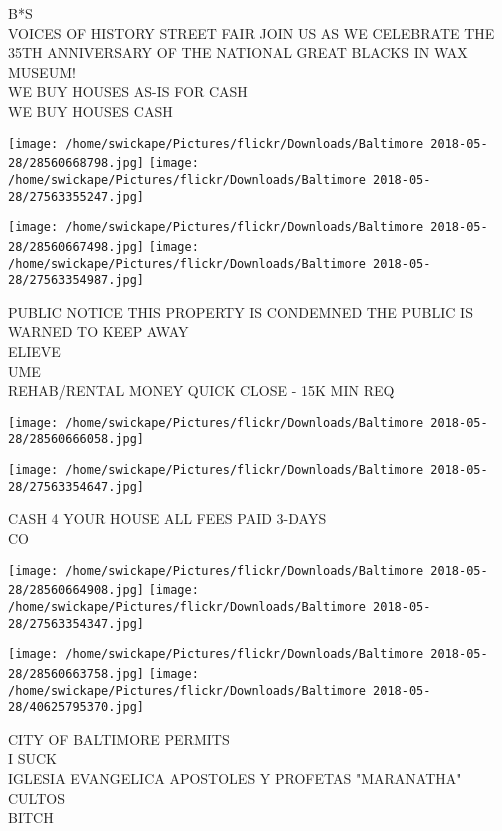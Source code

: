 \documentclass[10pt,letterpaper]{article}
\begin{document}
B*S\\
VOICES OF HISTORY STREET FAIR JOIN US AS WE CELEBRATE THE 35TH ANNIVERSARY OF THE NATIONAL GREAT BLACKS IN WAX MUSEUM!\\
WE BUY HOUSES AS{-}IS FOR CASH\\
WE BUY HOUSES CASH\\
\pagebreak

\texttt{[image: /home/swickape/Pictures/flickr/Downloads/Baltimore 2018-05-28/28560668798.jpg]}
\texttt{[image: /home/swickape/Pictures/flickr/Downloads/Baltimore 2018-05-28/27563355247.jpg]}

\texttt{[image: /home/swickape/Pictures/flickr/Downloads/Baltimore 2018-05-28/28560667498.jpg]}
\texttt{[image: /home/swickape/Pictures/flickr/Downloads/Baltimore 2018-05-28/27563354987.jpg]}

PUBLIC NOTICE THIS PROPERTY IS CONDEMNED THE PUBLIC IS WARNED TO KEEP AWAY\\
ELIEVE\\
UME\\
REHAB/RENTAL MONEY QUICK CLOSE {-} 15K MIN REQ\\
\pagebreak

\texttt{[image: /home/swickape/Pictures/flickr/Downloads/Baltimore 2018-05-28/28560666058.jpg]}

\vspace{0.25in}
\texttt{[image: /home/swickape/Pictures/flickr/Downloads/Baltimore 2018-05-28/27563354647.jpg]}

CASH 4 YOUR HOUSE ALL FEES PAID 3{-}DAYS\\
CO\\
\pagebreak

\texttt{[image: /home/swickape/Pictures/flickr/Downloads/Baltimore 2018-05-28/28560664908.jpg]}
\texttt{[image: /home/swickape/Pictures/flickr/Downloads/Baltimore 2018-05-28/27563354347.jpg]}

\texttt{[image: /home/swickape/Pictures/flickr/Downloads/Baltimore 2018-05-28/28560663758.jpg]}
\texttt{[image: /home/swickape/Pictures/flickr/Downloads/Baltimore 2018-05-28/40625795370.jpg]}

CITY OF BALTIMORE PERMITS\\
I SUCK\\
IGLESIA EVANGELICA APOSTOLES Y PROFETAS "MARANATHA" CULTOS\\
BITCH\\
\pagebreak
\end{document}
